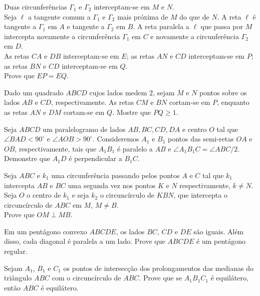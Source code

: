 \begin{questao}
  Duas circunferências $\Gamma_1$ e $\Gamma_2$
  interceptam-se em $M$ e $N$.\\
  Seja $\ell$ a tangente comum a  $\Gamma_1$ e
  $\Gamma_2$ mais próxima de $M$ do que de $N$. A reta
  $\ell$ é tangente a $\Gamma_1$ em $A$ e tangente a
  $\Gamma_2$ em $B$. A reta paralela a $\ell$ que passa
  por $M$ intercepta novamente a circunferência $\Gamma_1$ em
  $C$ e novamente a circunferência $\Gamma_2$ em $D$.\\
  As retas $CA$ e $DB$ interceptam-se em $E$; as retas $AN$ e
  $CD$ interceptam-se em $P$; as retas $BN$ e $CD$
  interceptam-se em $Q$.\\
  Prove que $EP=EQ$.
\end{questao}

\begin{questao}
  Dado um quadrado $ABCD$ cujos lados medem $2$, sejam
  $M$ e $N$ pontos sobre os lados $AB$ e $CD$,
  respectivamente. As retas $CM$ e $BN$ cortam-se em $P$,
  enquanto as retas $AN$ e $DM$ cortam-se em $Q$. Mostre que
  $PQ \geq 1$.
\end{questao}

\begin{questao}
  Seja $ABCD$ um paralelogramo de lados $AB,BC,CD,DA$ e
  centro $O$ tal que $\angle BAD < 90^\circ$ e $\angle AOB >
  90^\circ$. Consideremos $A_1$ e $B_1$ pontos das semi-retas
  $OA$ e $OB$, respectivamente, tais que $A_1B_1$ é paralelo a
  $AB$ e $\angle A_1B_1C = \angle ABC/2$. Demonstre que $A_1D$ é
  perpendicular a $B_1C$.
\end{questao}

\begin{questao}
  Seja $ABC$ e $k_1$ uma circunferência passando pelos
  pontos $A$ e $C$ tal que $k_1$ intercepta $AB$ e $BC$ uma
  segunda vez nos pontos $K$ e $N$ respectivamente, $k \not =
  N$. Seja $O$ o centro de $k_1$ e seja $k_2$ o circuncírculo
  de $KBN$, que intercepta o circuncírculo de $ABC$ em $M$, $M
  \not = B$.\\
  Prove que $OM \perp MB$.
\end{questao}

\begin{questao}
  Em um pentágono convexo $ABCDE$, os lados $BC$, $CD$
  e $DE$ são iguais. Além disso, cada diagonal é paralela a um
  lado. Prove que $ABCDE$ é um pentágono regular.
\end{questao}

\begin{questao}
  Sejam $A_1$, $B_1$ e $C_1$ os pontos de intersecção
  dos prolongamentos das medianas do triângulo $ABC$ com o
  circuncírculo de $ABC$. Prove que se $A_1B_1C_1$ é equilátero, então
  $ABC$ é equilátero.
\end{questao}


